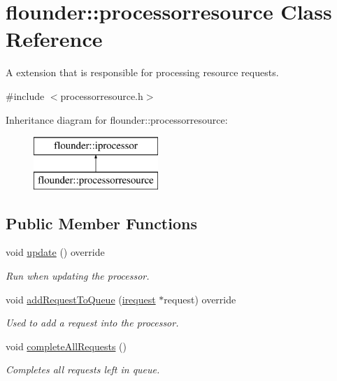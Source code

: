 \hypertarget{classflounder_1_1processorresource}{}\section{flounder\+:\+:processorresource Class Reference}
\label{classflounder_1_1processorresource}


A extension that is responsible for processing resource requests.  




{\ttfamily \#include $<$processorresource.\+h$>$}

Inheritance diagram for flounder\+:\+:processorresource\+:\begin{figure}[H]
\begin{center}
\leavevmode
\includegraphics[height=2.000000cm]{classflounder_1_1processorresource}
\end{center}
\end{figure}
\subsection*{Public Member Functions}
\begin{DoxyCompactItemize}
\item 
void \hyperlink{classflounder_1_1processorresource_afaeb27a9673c1f9b4366b537b7c0d377}{update} () override
\begin{DoxyCompactList}\small\item\em Run when updating the processor. \end{DoxyCompactList}\item 
void \hyperlink{classflounder_1_1processorresource_a4ae0dda615f98e93faadda22e74d61e2}{add\+Request\+To\+Queue} (\hyperlink{classflounder_1_1irequest}{irequest} $\ast$request) override
\begin{DoxyCompactList}\small\item\em Used to add a request into the processor. \end{DoxyCompactList}\item 
void \hyperlink{classflounder_1_1processorresource_afde339d8e44544307abd585e8294fa85}{complete\+All\+Requests} ()
\begin{DoxyCompactList}\small\item\em Completes all requests left in queue. \end{DoxyCompactList}\end{DoxyCompactItemize}
